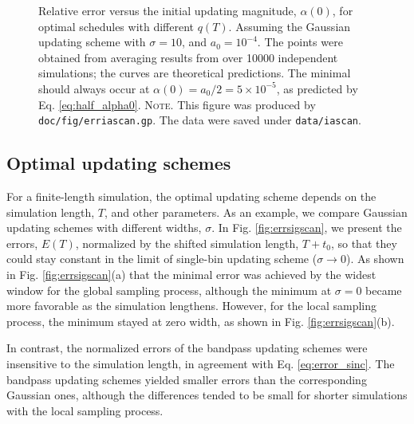 \documentclass[reprint, superscriptaddress, floatfix]{revtex4-1}
\newcommand{\note}[1]{{\color{DarkGreen}\footnotesize \textsc{Note.} #1}}
\newcommand{\Err}{E}
\begin{document}
\begin{figure}[h]
\begin{center}
  \caption{
    \label{fig:erriascan}
    Relative error
    versus the initial updating magnitude, $\alpha(0)$,
    for optimal schedules with different $q(T)$.
    Assuming the Gaussian updating scheme
    with $\sigma = 10$,
    and $a_0 = 10^{-4}$.
    The points were obtained from averaging results
    from over 10000 independent simulations;
    the curves are theoretical predictions.
    The minimal should always occur at
    $\alpha(0) = a_0/2 = 5 \times 10^{-5}$,
    as predicted by Eq. \eqref{eq:half_alpha0}.
    \note{This figure was produced by
      \texttt{doc/fig/erriascan.gp}.
      The data were saved under
      \texttt{data/iascan}.
    }%
  }
\end{center}
\end{figure}






\subsection{\label{sec:results_cmpschemes}
Optimal updating schemes}



For a finite-length simulation,
the optimal updating scheme
depends on the simulation length, $T$,
and other parameters.
%
As an example,
we compare Gaussian updating schemes
with different widths, $\sigma$.
%
In Fig. \ref{fig:errsigscan},
we present the errors, $\Err(T)$,
normalized by the shifted simulation length, $T+t_0$,
so that they could
stay constant in the limit of single-bin updating scheme
($\sigma \to 0$).
%
As shown in Fig. \ref{fig:errsigscan}(a)
that the minimal error was achieved
by the widest window %
for the global sampling process,
%
although
the minimum at $\sigma = 0$ became more favorable
as the simulation lengthens.
%
However,
for the local sampling process,
the minimum stayed at zero width,
as shown in Fig. \ref{fig:errsigscan}(b).


In contrast,
the normalized errors of the bandpass updating schemes
were insensitive to the simulation length,
in agreement with Eq. \eqref{eq:error_sinc}.
%
The bandpass updating schemes
yielded smaller errors than
the corresponding Gaussian ones,
although the differences tended to
be small for shorter simulations
with the local sampling process.
\end{document}
